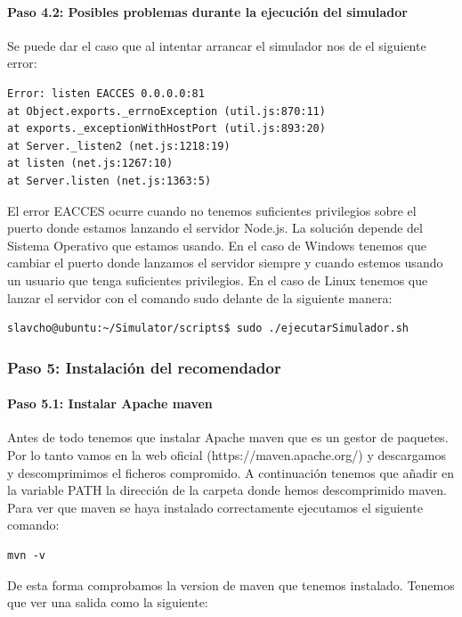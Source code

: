 \paragraph{Paso 4.2: Posibles problemas durante la ejecución del simulador}

Se puede dar el caso que al intentar arrancar el simulador nos de el siguiente error:

\begin{lstlisting}[language=xml, frame=single]
Error: listen EACCES 0.0.0.0:81
at Object.exports._errnoException (util.js:870:11)
at exports._exceptionWithHostPort (util.js:893:20)
at Server._listen2 (net.js:1218:19)
at listen (net.js:1267:10)
at Server.listen (net.js:1363:5)
\end{lstlisting}

El error EACCES ocurre cuando no tenemos suficientes privilegios sobre el puerto donde estamos lanzando el servidor Node.js. La solución depende del Sistema Operativo que estamos usando. En el caso de Windows tenemos que cambiar el puerto donde lanzamos el servidor siempre y cuando estemos usando un usuario que tenga suficientes privilegios. En el caso de Linux tenemos que lanzar el servidor con el comando sudo delante de la siguiente manera:

\begin{lstlisting}[language=xml, frame=single]
slavcho@ubuntu:~/Simulator/scripts$ sudo ./ejecutarSimulador.sh
\end{lstlisting}

\subsubsection{Paso 5: Instalación del recomendador}

\paragraph{Paso 5.1: Instalar Apache maven}

Antes de todo tenemos que instalar Apache maven que es un gestor de paquetes. Por lo tanto vamos en la web oficial (https://maven.apache.org/) y descargamos y descomprimimos el ficheros compromido. A continuación tenemos que añadir en la variable PATH la dirección de la carpeta donde hemos descomprimido maven. Para ver que maven se haya instalado correctamente ejecutamos el siguiente comando:
\begin{lstlisting}[language=xml, frame=single]
mvn -v
\end{lstlisting}
De esta forma comprobamos la version de maven que tenemos instalado. Tenemos que ver una salida como la siguiente: \newline


